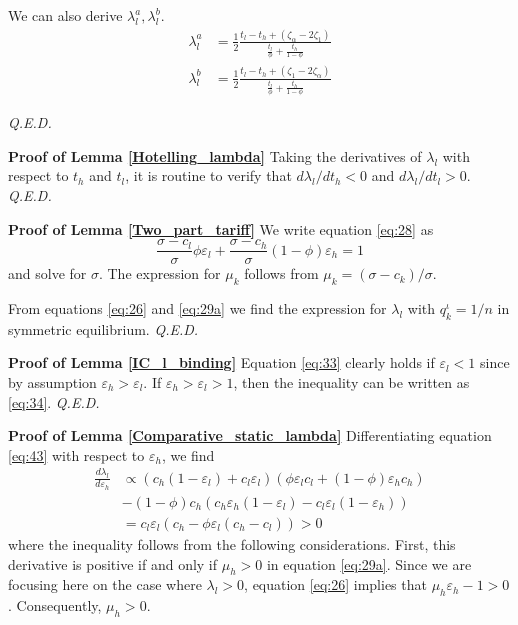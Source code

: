 \documentclass[12pt,english,a4paper]{article}
\newcommand{\qed}{\hspace*{\fill} {\em Q.E.D.}}
\begin{document}
We can also derive \(\lambda_{l}^a,\lambda_{l}^b\).
\begin{align}
\label{eq:48}
\lambda_{l}^a &= \frac{1}{2} \frac{t_l - t_h + (\zeta_{\alpha} - 2\zeta_1)}{\frac{t_l}{\phi}+\frac{t_h}{1-\phi}} \\
\label{eq:48b}
\lambda_{l}^b &= \frac{1}{2} \frac{t_l - t_h + (\zeta_{1} - 2\zeta_{\alpha})}{\frac{t_l}{\phi}+\frac{t_h}{1-\phi}}
\end{align}

 \qed


\textbf{Proof of Lemma \ref{Hotelling_lambda}}
Taking the derivatives of \(\lambda_l\) with respect to \(t_h\) and \(t_l\), it is routine to verify that \(d\lambda_l/d t_h <0\) and \(d\lambda_l/dt_l > 0\). 
 \qed

\textbf{Proof of Lemma \ref{Two_part_tariff}}
We write equation \eqref{eq:28} as
\begin{equation}
\label{eq:31}
\frac{\sigma-c_l}{\sigma}\phi \varepsilon_l+\frac{\sigma-c_h}{\sigma}(1-\phi) \varepsilon_h = 1
\end{equation}
and solve for \(\sigma\). The expression for \(\mu_k\) follows from \(\mu_k=(\sigma-c_k)/\sigma\).

From equations \eqref{eq:26} and \eqref{eq:29a} we find the expression for \(\lambda_l\) with \(q_k^{\iota}=1/n\) in symmetric equilibrium. 
 \qed


\textbf{Proof of Lemma \ref{IC_l_binding}}
Equation \eqref{eq:33} clearly holds if \(\varepsilon_l < 1\) since by assumption \(\varepsilon_h > \varepsilon_l\).
If \(\varepsilon_{h} > \varepsilon_l > 1\), then the inequality can be written as \eqref{eq:34}. 
 \qed

\textbf{Proof of Lemma \ref{Comparative_static_lambda}}
Differentiating equation \eqref{eq:43} with respect to \(\varepsilon_h\), we find
\begin{align*}
\frac{d \lambda_l}{d \varepsilon_h} &\propto (c_h (1-\varepsilon_l)+c_l \varepsilon_l) (\phi \varepsilon_l c_l + (1-\phi) \varepsilon_hc_h)\\
  & - (1-\phi) c_h (c_h \varepsilon_h (1-\varepsilon_l) - c_l \varepsilon_l(1-\varepsilon_h)) \\
 &= c_l \varepsilon_l (c_h - \phi \varepsilon_l (c_h-c_l)) > 0
\end{align*}
where the inequality follows from the following considerations. First, this derivative is positive if and only if \(\mu_h >0\) in equation \eqref{eq:29a}. Since we are focusing here on the case where \(\lambda_l >0\), equation \eqref{eq:26} implies that \(\mu_h \varepsilon_h - 1>0\). Consequently, \(\mu_h >0\).
\end{document}
